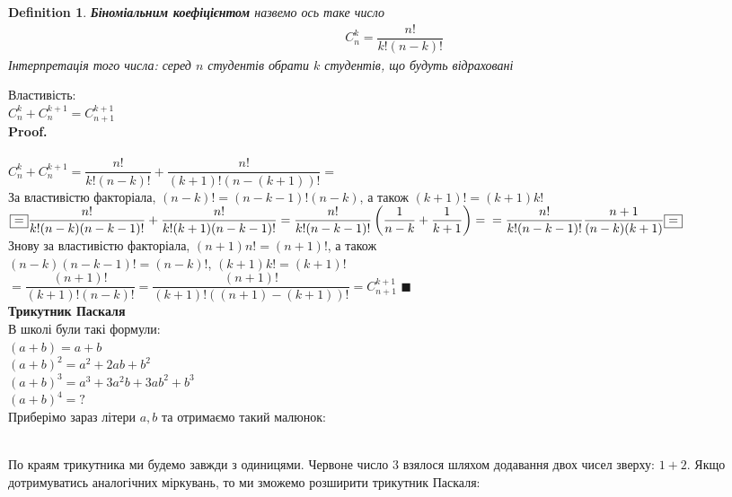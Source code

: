 \documentclass[a4paper, 14pt]{extarticle}
\def\bigline{\vspace{5mm}\\}
\theoremstyle{theoremdd}
\theoremstyle{theoremdd}
\newtheorem{definition}[theorem]{Definition}
\theoremstyle{theoremdd}
\theoremstyle{theoremdd}
\theoremstyle{theoremdd}
\theoremstyle{theoremdd}
\theoremstyle{theoremdd}
\theoremstyle{theoremdd}
\newenvironment{pf}{\vspace*{-3mm} \textbf{Proof. \\}}{$\blacksquare$}
\begin{document}
	\begin{definition}
	\textbf{Біноміальним коефіцієнтом} назвемо ось таке число
	\begin{align*}
	C_n^k = \dfrac{n!}{k!(n-k)!}
	\end{align*}
	Інтерпретація того числа: серед $n$ студентів обрати $k$ студентів, що будуть відраховані
	\end{definition}

	Властивість:\\
	$C_n^k + C_n^{k+1} = C_{n+1}^{k+1}$\\
	\begin{pf}
	\\
	$C_n^k + C_n^{k+1} = \dfrac{n!}{k!(n-k)!} + \dfrac{n!}{(k+1)!(n-(k+1))!} \boxed{=}$\\
	За властивістю факторіала, $(n-k)! = (n-k-1)!(n-k)$, а також $(k+1)! = (k+1)k!$\\
	$\boxed{=} \dfrac{n!}{k!(n-k)(n-k-1)!} + \dfrac{n!}{k!(k+1)(n-k-1)!} = \dfrac{n!}{k!(n-k-1)!} \left(\dfrac{1}{n-k} + \dfrac{1}{k+1} \right) = \\ = \dfrac{n!}{k!(n-k-1)!} \dfrac{n+1}{(n-k)(k+1)} \boxed{=}$\\
	Знову за властивістю факторіала, $(n+1)n! = (n+1)!$, а також \\ $(n-k)(n-k-1)! = (n-k)!$, $(k+1)k! = (k+1)!$ \\
	$\boxed{=} \dfrac{(n+1)!}{(k+1)!(n-k)!} = \dfrac{(n+1)!}{(k+1)!((n+1)-(k+1))!} = C_{n+1}^{k+1}$
	\end{pf}
	\bigline
	\textbf{Трикутник Паскаля}\\
	В школі були такі формули:\\
	$(a+b) = a + b$\\
	$(a+b)^2 = a^2+2ab + b^2$\\
	$(a+b)^3 = a^3 + 3a^2b + 3ab^2 + b^3$\\
	$(a+b)^4 = ?$\\
	Приберімо зараз літери $a,b$ та отримаємо такий малюнок:\\
	\\
	По краям трикутника ми будемо завжди з одиницями. Червоне число $3$ взялося шляхом додавання двох чисел зверху: $1 + 2$. Якщо дотримуватись аналогічних міркувань, то ми зможемо розширити трикутник Паскаля:\\
\end{document}
